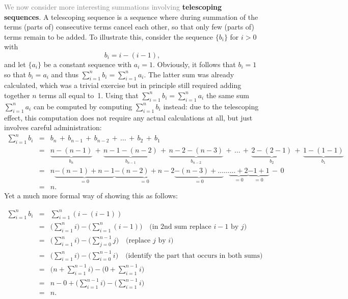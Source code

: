 \documentclass[titlepage]{article}
\theoremstyle{definition}
\numberwithin{equation}{subsection}
\numberwithin{remark}{subsection}
\begin{document}
\textcolor{gray}{We now consider more interesting summations involving} \textbf{telescoping sequences}. A telescoping sequence is a sequence where during summation of the terms (parts of) consecutive terms cancel each other, so that only few (parts of) terms remain to be added.
To illustrate this, consider the sequence $\{b_i\}$ for $i>0$ with $$b_i=i-(i-1),$$
and let $\{a_i\}$ be a constant sequence with $a_i=1$.
Obviously, it follows that $b_i=1$ so that $b_i=a_i$ and thus $\sum_{i=1}^nb_i=\sum_{i=1}^na_i$. The latter sum was already calculated, which was a trivial exercise but in principle still required adding together $n$ terms all equal to~1. Using that $\sum_{i=1}^nb_i=\sum_{i=1}^na_i$ the same sum $\sum_{i=1}^na_i$ can be computed by computing $\sum_{i=1}^nb_i$ instead: due to the telescoping effect, this computation does not require any actual calculations at all, but just involves careful administration:
\begin{eqnarray*}
\sum_{i=1}^nb_i&=&b_n\,+\,b_{n-1}\,+\,b_{n-2}\,+\,\ldots\,+\,b_2\,+\,b_1\\
&=&\underbrace{n-(n-1)}_{b_n}\,+\,\underbrace{n-1-(n-2)}_{b_{n-1}}\,+\,\underbrace{n-2-(n-3)}_{b_{n-2}}\,+\,\ldots\,+\,\underbrace{2-(2-1)}_{b_{2}}\,+\,\underbrace{1-(1-1)}_{b_{1}}\\
&=&n\underbrace{-(n-1)+n-1}_{=0}\underbrace{-(n-2)+n-2}_{=0}\underbrace{-(n-3)+\ldots}_{=0}\ldots\underbrace{\ldots+2}_{=0}\underbrace{-1+1}_{=0}\,-\,0\\
&=&n.
\end{eqnarray*}
\clearpage
Yet a much more formal way of showing this as follows:

\begin{eqnarray*}
\sum_{i=1}^nb_i&=&\sum_{i=1}^n(i-(i-1))\\
&=&\Big(\sum_{i=1}^ni\Big)-\Big(\sum_{i=1}^n(i-1)\Big)\,\,\,\,\text{     (in 2nd sum replace $i-1$ by $j$)} \\
&=&\Big(\sum_{i=1}^{n}i\Big)-\Big(\sum_{j=0}^{n-1}j\Big)\,\,\,\,\text{     (replace $j$ by $i$)} \\
&=&\Big(\sum_{i=1}^{n}i\Big)-\Big(\sum_{i=0}^{n-1}i\Big)\,\,\,\,\text{     (identify the part that occurs in both sums)} \\
&=&\Big(n+\sum_{i=1}^{n-1}i\Big)-\Big(0+\sum_{i=1}^{n-1}i\Big)\\
&=&n-0+\Big(\sum_{i=1}^{n-1}i\Big)-\Big(\sum_{i=1}^{n-1}i\Big)\\
&=&n.
\end{eqnarray*}
\end{document}
